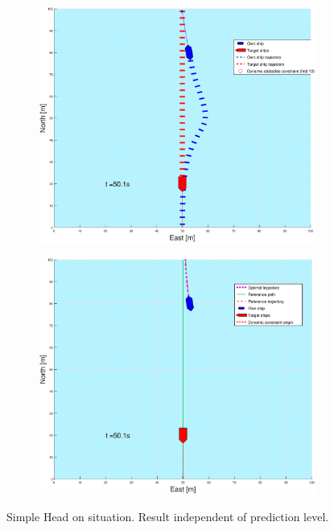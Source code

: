 \begin{figure}[ht!]
\begin{subfigure}[b]{0.499\textwidth}
    \end{subfigure}
    \hfill
    \\
    \begin{subfigure}[b]{0.49\textwidth}
        \centering
        \includegraphics[width=\textwidth]{Images/Figures/enkel_HO/_Simple_0fig1_time=50}
    \end{subfigure}
    \hfill
    \begin{subfigure}[b]{0.499\textwidth}
        \centering
        \includegraphics[width=\textwidth]{Images/Figures/enkel_HO/_Simple_0fig999_time=50}
    \end{subfigure}
    \hfill
    \caption{Simple Head on situation. Result independent of prediction level.}
    \label{FIG: Simple HO}
\end{figure}%
